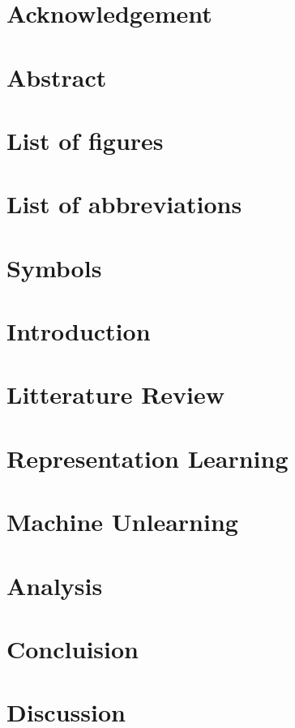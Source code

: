\documentclass[12pt]{report}
\begin{document}



\chapter*{Acknowledgement}


\chapter*{Abstract}




\chapter*{List of figures}
\listoffigures


\chapter*{List of abbreviations}



\chapter*{Symbols}


\tableofcontents

\chapter{Introduction}




\chapter{Litterature Review}



\chapter{Representation Learning}




\chapter{Machine Unlearning}


\chapter{Analysis}

\chapter{Concluision}

\chapter{Discussion}

\printbibliography
\end{document}
